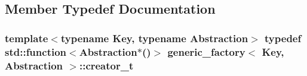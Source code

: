 \subsection{Member Typedef Documentation}
\hypertarget{structgeneric__factory_a9df30a5e7a264edbc819878ce107841a}{
\subsubsection[{creator\_\-t}]{\setlength{\rightskip}{0pt plus 5cm}template$<$typename Key, typename Abstraction$>$ typedef std::function$<$Abstraction$\ast$()$>$ {\bf generic\_\-factory}$<$ Key, Abstraction $>$::{\bf creator\_\-t}}}
\label{structgeneric__factory_a9df30a5e7a264edbc819878ce107841a}


